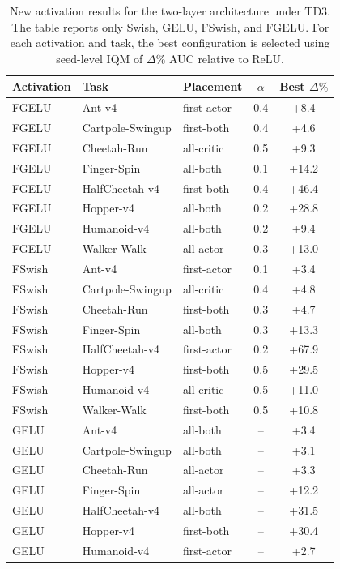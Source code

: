 \begin{table}[t]
\centering
\small
\setlength{\tabcolsep}{4pt}
\renewcommand{\arraystretch}{1.12}
\caption{New activation results for the two-layer architecture under TD3. The table reports only Swish, GELU, FSwish, and FGELU. For each activation and task, the best configuration is selected using seed-level IQM of $\Delta\%$ AUC relative to ReLU.}
\label{tab:new-results-td3-2layers}
\begin{tabular}{lllcc}
\toprule
Activation & Task & Placement & $\alpha$ & Best $\Delta\%$ \\
\midrule
FGELU & Ant-v4 & first-actor & 0.4 & +8.4 \\
FGELU & Cartpole-Swingup & first-both & 0.4 & +4.6 \\
FGELU & Cheetah-Run & all-critic & 0.5 & +9.3 \\
FGELU & Finger-Spin & all-both & 0.1 & +14.2 \\
FGELU & HalfCheetah-v4 & first-both & 0.4 & +46.4 \\
FGELU & Hopper-v4 & all-both & 0.2 & +28.8 \\
FGELU & Humanoid-v4 & all-both & 0.2 & +9.4 \\
FGELU & Walker-Walk & all-actor & 0.3 & +13.0 \\
FSwish & Ant-v4 & first-actor & 0.1 & +3.4 \\
FSwish & Cartpole-Swingup & all-critic & 0.4 & +4.8 \\
FSwish & Cheetah-Run & first-both & 0.3 & +4.7 \\
FSwish & Finger-Spin & all-both & 0.3 & +13.3 \\
FSwish & HalfCheetah-v4 & first-actor & 0.2 & +67.9 \\
FSwish & Hopper-v4 & first-both & 0.5 & +29.5 \\
FSwish & Humanoid-v4 & all-critic & 0.5 & +11.0 \\
FSwish & Walker-Walk & first-both & 0.5 & +10.8 \\
GELU & Ant-v4 & all-both & -- & +3.4 \\
GELU & Cartpole-Swingup & all-both & -- & +3.1 \\
GELU & Cheetah-Run & all-actor & -- & +3.3 \\
GELU & Finger-Spin & all-actor & -- & +12.2 \\
GELU & HalfCheetah-v4 & all-both & -- & +31.5 \\
GELU & Hopper-v4 & first-both & -- & +30.4 \\
GELU & Humanoid-v4 & first-actor & -- & +2.7 \\

\end{tabular}
\end{table}
